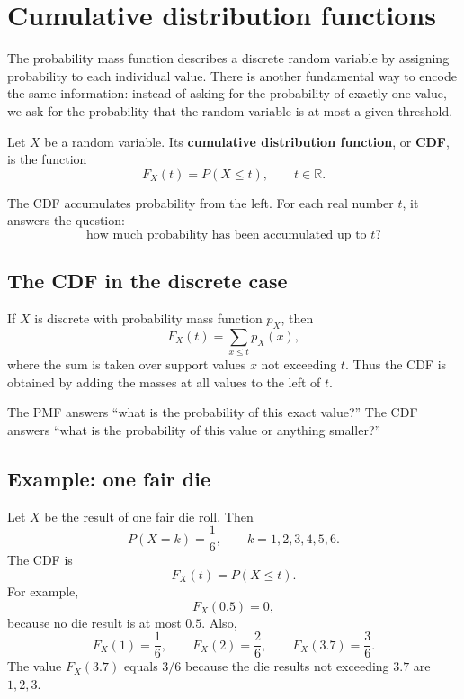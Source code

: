 \section{Cumulative distribution functions}

The probability mass function describes a discrete random variable by assigning
probability to each individual value. There is another fundamental way to encode
the same information: instead of asking for the probability of exactly one value,
we ask for the probability that the random variable is at most a given threshold.

\begin{definitionbox}
Let \(X\) be a random variable. Its \textbf{cumulative distribution function}, or
\textbf{CDF}, is the function
\[
F_X(t)=P(X\leq t),
\qquad t\in\mathbb{R}.
\]
\end{definitionbox}

The CDF accumulates probability from the left. For each real number \(t\), it
answers the question:
\[
\text{how much probability has been accumulated up to }t?
\]

\subsection*{The CDF in the discrete case}

If \(X\) is discrete with probability mass function \(p_X\), then
\[
F_X(t)=\sum_{x\leq t}p_X(x),
\]
where the sum is taken over support values \(x\) not exceeding \(t\). Thus the
CDF is obtained by adding the masses at all values to the left of \(t\).

\begin{remarkbox}
The PMF answers ``what is the probability of this exact value?'' The CDF answers
``what is the probability of this value or anything smaller?''
\end{remarkbox}

\subsection*{Example: one fair die}

Let \(X\) be the result of one fair die roll. Then
\[
P(X=k)=\frac16,\qquad k=1,2,3,4,5,6.
\]
The CDF is
\[
F_X(t)=P(X\leq t).
\]
For example,
\[
F_X(0.5)=0,
\]
because no die result is at most \(0.5\). Also,
\[
F_X(1)=\frac16,\qquad F_X(2)=\frac26,\qquad F_X(3.7)=\frac36.
\]
The value \(F_X(3.7)\) equals \(3/6\) because the die results not exceeding
\(3.7\) are \(1,2,3\).

